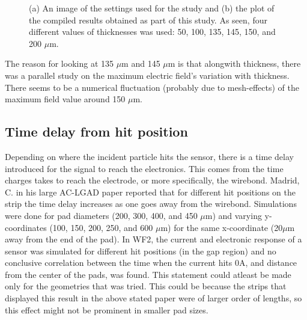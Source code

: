 \documentclass[11pt]{article}
\begin{document}
\begin{figure}[h!]
\begin{subfigure}[t]{0.49\textwidth}
        \caption{}
        \label{fig:thickness_plot}
    \end{subfigure}
    \caption{(a) An image of the settings used for the study and (b) the plot of the compiled results obtained as part of this study. As seen, four different values of thicknesses was used: 50, 100, 135, 145, 150, and 200 $\mu$m.}
\end{figure}

The reason for looking at 135 $\mu$m and 145 $\mu$m is that alongwith thickness, there was a parallel study on the maximum electric field's variation with thickness. There seems to be a numerical fluctuation (probably due to mesh-effects) of the maximum field value around 150 $\mu$m.

\subsection{Time delay from hit position}
Depending on where the incident particle hits the sensor, there is a time delay introduced for the signal to reach the electronics. This comes from the time charges takes to reach the electrode, or more specifically, the wirebond. Madrid, C. in his large AC-LGAD paper reported that for different hit positions on the strip the time delay increases as one goes away from the wirebond. Simulations were done for pad diameters (200, 300, 400, and 450 $\mu$m) and varying y-coordinates (100, 150, 200, 250, and 600 $\mu$m) for the same x-coordinate (20$\mu$m away from the end of the pad). In WF2, the current and electronic response of a sensor was simulated for different hit positions (in the gap region) and no conclusive correlation between the time when the current hits 0A, and distance from the center of the pads, was found. This statement could atleast be made only for the geometries that was tried. This could be because the strips that displayed this result in the above stated paper were of larger order of lengths, so this effect might not be prominent in smaller pad sizes.
\end{document}
